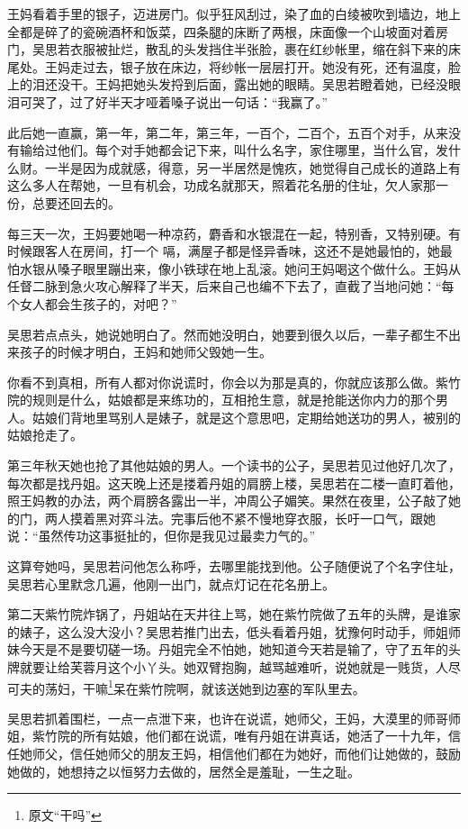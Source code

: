 王妈看着手里的银子，迈进房门。似乎狂风刮过，染了血的白绫被吹到墙边，地上全都是碎了的瓷碗酒杯和饭菜，四条腿的床断了两根，床面像一个山坡面对着房门，吴思若衣服被扯烂，散乱的头发挡住半张脸，裹在红纱帐里，缩在斜下来的床尾处。王妈走过去，银子放在床边，将纱帐一层层打开。她没有死，还有温度，脸上的泪还没干。王妈把她头发捋到后面，露出她的眼睛。吴思若瞪着她，已经没眼泪可哭了，过了好半天才哑着嗓子说出一句话：“我赢了。”

此后她一直赢，第一年，第二年，第三年，一百个，二百个，五百个对手，从来没有输给过他们。每个对手她都会记下来，叫什么名字，家住哪里，当什么官，发什么财。一半是因为成就感，得意，另一半居然是愧疚，她觉得自己成长的道路上有这么多人在帮她，一旦有机会，功成名就那天，照着花名册的住址，欠人家那一份，总要还回去的。

每三天一次，王妈要她喝一种凉药，麝香和水银混在一起，特别香，又特别硬。有时候跟客人在房间，打一个
嗝，满屋子都是怪异香味，这还不是她最怕的，她最怕水银从嗓子眼里蹦出来，像小铁球在地上乱滚。她问王妈喝这个做什么。王妈从任督二脉到急火攻心解释了半天，后来自己也编不下去了，直截了当地问她：“每个女人都会生孩子的，对吧？”

吴思若点点头，她说她明白了。然而她没明白，她要到很久以后，一辈子都生不出来孩子的时候才明白，王妈和她师父毁她一生。

你看不到真相，所有人都对你说谎时，你会以为那是真的，你就应该那么做。紫竹院的规则是什么，姑娘都是来练功的，互相抢生意，就是抢能送你内力的那个男人。姑娘们背地里骂别人是婊子，就是这个意思吧，定期给她送功的男人，被别的姑娘抢走了。

第三年秋天她也抢了其他姑娘的男人。一个读书的公子，吴思若见过他好几次了，每次都是找丹姐。这天晚上还是搂着丹姐的肩膀上楼，吴思若在二楼一直盯着他，照王妈教的办法，两个肩膀各露出一半，冲周公子媚笑。果然在夜里，公子敲了她的门，两人摸着黑对弈斗法。完事后他不紧不慢地穿衣服，长吁一口气，跟她说：“虽然传功这事挺扯的，但你是我见过最卖力气的。”

这算夸她吗，吴思若问他怎么称呼，去哪里能找到他。公子随便说了个名字住址，吴思若心里默念几遍，他刚一出门，就点灯记在花名册上。

第二天紫竹院炸锅了，丹姐站在天井往上骂，她在紫竹院做了五年的头牌，是谁家的婊子，这么没大没小？吴思若推门出去，低头看着丹姐，犹豫何时动手，师姐师妹今天是不是要切磋一场。丹姐完全不怕她，她知道今天若是输了，守了五年的头牌就要让给芙蓉月这个小丫头。她双臂抱胸，越骂越难听，说她就是一贱货，人尽可夫的荡妇，干嘛\footnote{原文“干吗”}呆在紫竹院啊，就该送她到边塞的军队里去。

吴思若抓着围栏，一点一点泄下来，也许在说谎，她师父，王妈，大漠里的师哥师姐，紫竹院的所有姑娘，他们都在说谎，唯有丹姐在讲真话，她活了一十九年，信任她师父，信任她师父的朋友王妈，相信他们都在为她好，而他们让她做的，鼓励她做的，她想持之以恒努力去做的，居然全是羞耻，一生之耻。
\newline

